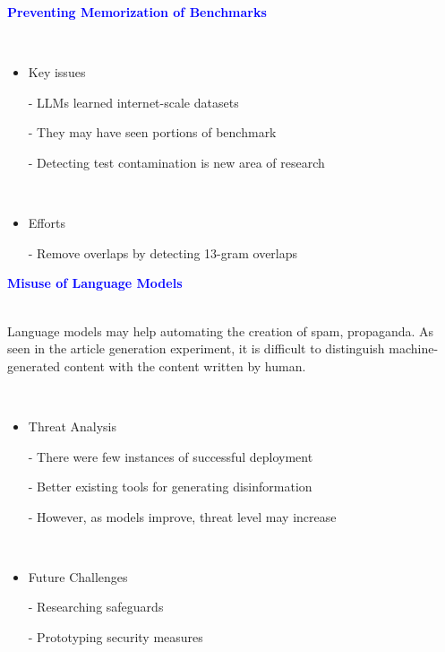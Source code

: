\documentclass[professionalfont]{beamer}
\begin{document}
\begin{frame}

\begin{center}
    { \textbf{\textcolor{blue}{ {\fontsize{12}{14}\selectfont Preventing Memorization of Benchmarks} }} }
\end{center}
\\[0.2cm]

{\fontsize{10}{14}\selectfont 
\begin{itemize}
    \item Key issues

    - LLMs learned internet-scale datasets

    - They may have seen portions of benchmark

    - Detecting test contamination is new area of research

    \\[0.2cm]

    \item Efforts

    - Remove overlaps by detecting 13-gram overlaps

    

\end{itemize}
}

\end{frame}

\begin{frame}

\begin{center}
    { \textbf{\textcolor{blue}{ {\fontsize{12}{14}\selectfont Misuse of Language Models} }} }
\end{center}
\\[0.2cm]

{\fontsize{10}{14}\selectfont 
Language models may help automating the creation of spam, propaganda. 
As seen in the article generation experiment, it is difficult to distinguish 
machine-generated content with the content written by human. \\
}

\\[0.2cm]

{\fontsize{10}{14}\selectfont 
\begin{itemize}
    \item Threat Analysis

    - There were few instances of successful deployment

    - Better existing tools for generating disinformation

    - However, as models improve, threat level may increase

    \\[0.2cm]

    \item Future Challenges

    - Researching safeguards

    - Prototyping security measures

\end{itemize}
}

\end{frame}
\end{document}
